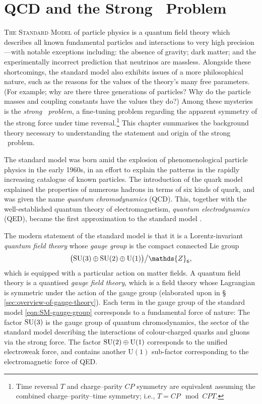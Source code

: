 \chapter{QCD and the Strong \CP\ Problem}

\textsc{The Standard Model} of particle physics is a quantum field theory which describes all known fundamental particles and interactions to very high precision---with notable exceptions including:
the absence of gravity;
dark matter;
and the experimentally incorrect prediction that neutrinos are massless.
Alongside these shortcomings, the standard model also exhibits issues of a more philosophical nature, such as the reasons for the values of the theory's many free parameters. (For example; why are there three generations of particles? Why do the particle masses and coupling constants have the values they do?)
Among these mysteries is the \emph{strong \CP\ problem}, a fine-tuning problem regarding the apparent symmetry of the strong force under time reversal.\footnote{Time reversal $T$ and charge--parity $CP$ symmetry are equivalent assuming the combined charge--parity--time symmetry; i.e., $T = CP \mod CPT$.}
This chapter summarises the background theory necessary to understanding the statement and origin of the strong \CP\ problem.

The standard model was born amid the explosion of phenomenological particle physics in the early 1960s, in an effort to explain the patterns in the rapidly increasing catalogue of known particles.
The introduction of the quark model explained the properties of numerous hadrons in terms of six kinds of quark, and was given the name \emph{quantum chromodynamics} (QCD). This, together with the well-established quantum theory of electromagnetism, \emph{quantum electrodynamics} (QED), became the first approximation to the standard model \cite{Weinberg_2004-history}.

The modern statement of the standard model is that it is a Lorentz-invariant \emph{quantum field theory} whose \emph{gauge group} is the compact connected Lie group
\begin{align}
	\qty\big(\SU(3)\oplus\SU(2)\oplus\mathrm{U}(1))\big/\mathds{Z}_6
	\label{eqn:SM-gauge-group}
,\end{align}
which is equipped with a particular action on matter fields.
A quantum field theory is a quantised \emph{gauge field theory}, which is a field theory whose Lagrangian is symmetric under the action of the gauge group (elaborated upon in §\,\ref{sec:overview-of-gauge-theory}).
Each term in the gauge group of the standard model \eqref{eqn:SM-gauge-group} corresponds to a fundamental force of nature:
The factor $\mathrm{SU}(3)$ is the gauge group of quantum chromodynamics, the sector of the standard model describing the interactions of colour-charged quarks and gluons via the strong force.
The factor $\mathrm{SU}(2)\oplus\mathrm{U}(1)$ corresponds to the unified electroweak force, and contains another $\mathrm{U}(1)$ sub-factor corresponding to the electromagnetic force of QED.

